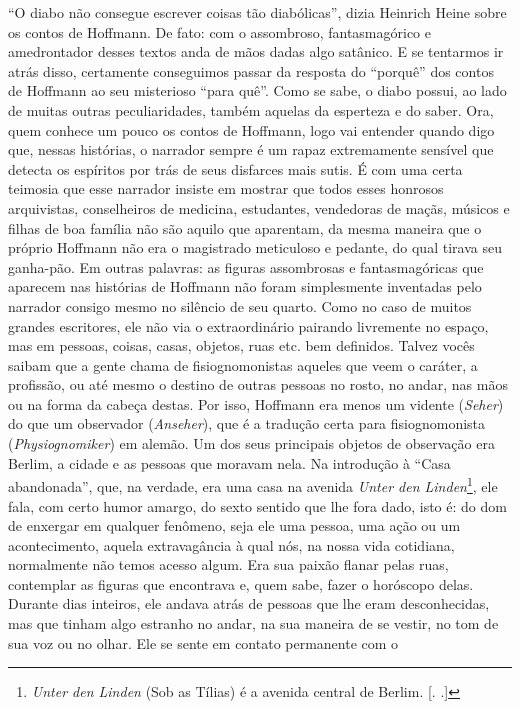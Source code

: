 ``O diabo não consegue escrever coisas tão diabólicas'', dizia Heinrich
Heine sobre os contos de Hoffmann. De fato: com o assombroso,
fantasmagórico e amedrontador desses textos anda de mãos dadas algo
satânico. E se tentarmos ir atrás disso, certamente conseguimos passar
da resposta do ``porquê'' dos contos de Hoffmann ao seu misterioso
``para quê''. Como se sabe, o diabo possui, ao lado de muitas outras
peculiaridades, também aquelas da esperteza e do saber. Ora, quem
conhece um pouco os contos de Hoffmann, logo vai entender quando digo
que, nessas histórias, o narrador sempre é um rapaz extremamente
sensível que detecta os espíritos por trás de seus disfarces mais sutis.
É com uma certa teimosia que esse narrador insiste em mostrar que todos
esses honrosos arquivistas, conselheiros de medicina, estudantes,
vendedoras de maçãs, músicos e filhas de boa família não são aquilo que
aparentam, da mesma maneira que o próprio Hoffmann não era o magistrado
meticuloso e pedante, do qual tirava seu ganha-pão. Em outras palavras:
as figuras assombrosas e fantasmagóricas que aparecem nas histórias de
Hoffmann não foram simplesmente inventadas pelo narrador consigo mesmo
no silêncio de seu quarto. Como no caso de muitos grandes escritores,
ele não via o extraordinário pairando livremente no espaço, mas em
pessoas, coisas, casas, objetos, ruas etc. bem definidos. Talvez vocês
saibam que a gente chama de fisiognomonistas aqueles que veem o caráter,
a profissão, ou até mesmo o destino de outras pessoas no rosto, no
andar, nas mãos ou na forma da cabeça destas. Por isso, Hoffmann era
menos um vidente (\emph{Seher}) do que um observador (\emph{Anseher}),
que é a tradução certa para fisiognomonista (\emph{Physiognomiker}) em
alemão. Um dos seus principais objetos de observação era Berlim, a
cidade e as pessoas que moravam nela. Na introdução à ``Casa
abandonada'', que, na verdade, era uma casa na avenida \emph{Unter den
Linden}\footnote{\emph{Unter den Linden} (Sob as Tílias) é a avenida
  central de Berlim. [. .]}, ele fala, com certo humor amargo,
do sexto sentido que lhe fora dado, isto é: do dom de enxergar em
qualquer fenômeno, seja ele uma pessoa, uma ação ou um acontecimento,
aquela extravagância à qual nós, na nossa vida cotidiana, normalmente
não temos acesso algum. Era sua paixão flanar pelas ruas, contemplar as
figuras que encontrava e, quem sabe, fazer o horóscopo delas. Durante
dias inteiros, ele andava atrás de pessoas que lhe eram desconhecidas,
mas que tinham algo estranho no andar, na sua maneira de se vestir, no
tom de sua voz ou no olhar. Ele se sente em contato permanente com o
